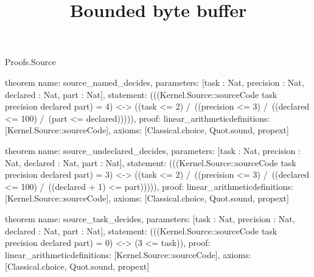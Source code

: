 \begin{lexlean}{Proofs.Source}
\title{Bounded byte buffer}
\begin{semanticmodule}
theorem{
  name: source_named_decides,
  parameters: [task : Nat, precision : Nat, declared : Nat, part : Nat],
  statement: (((Kernel.Source::sourceCode task precision declared part) = 4) <-> ((task <= 2) /\ ((precision <= 3) /\ ((declared <= 100) /\ (part <= declared))))),
  proof: linear_arithmetic{definitions: [Kernel.Source::sourceCode]},
  axioms: [Classical.choice, Quot.sound, propext]
}

theorem{
  name: source_undeclared_decides,
  parameters: [task : Nat, precision : Nat, declared : Nat, part : Nat],
  statement: (((Kernel.Source::sourceCode task precision declared part) = 3) <-> ((task <= 2) /\ ((precision <= 3) /\ ((declared <= 100) /\ ((declared + 1) <= part))))),
  proof: linear_arithmetic{definitions: [Kernel.Source::sourceCode]},
  axioms: [Classical.choice, Quot.sound, propext]
}

theorem{
  name: source_task_decides,
  parameters: [task : Nat, precision : Nat, declared : Nat, part : Nat],
  statement: (((Kernel.Source::sourceCode task precision declared part) = 0) <-> (3 <= task)),
  proof: linear_arithmetic{definitions: [Kernel.Source::sourceCode]},
  axioms: [Classical.choice, Quot.sound, propext]
}
\end{semanticmodule}
\end{lexlean}
